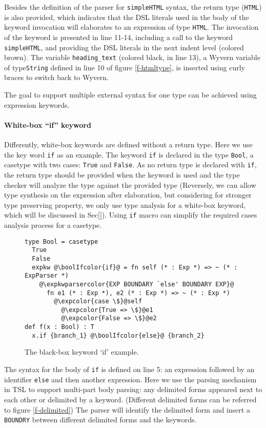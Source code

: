 \documentclass{sig-alternate}
\newcommand{\expkwparsercolor}[1]{\textcolor[HTML]{336699}{#1}}
\newcommand{\expcolor}[1]{\textcolor[HTML]{FF0033}{#1}}
\newcommand{\boolIfcolor}[1]{\textcolor[HTML]{5E0C0C}{#1}}
\newcommand{\mycaption}[1]{\vspace{-4px}\caption{#1}\vspace{-2px}}
\begin{document}
Besides the definition of the parser for \verb|simpleHTML| syntax, the return type (\verb|HTML|) is also provided, which indicates that the DSL literals used in the body of the keyword invocation will elaborates to an expression of type \verb|HTML|. The invocation of the keyword is presented in line 11-14, including a call to the keyword \verb|simpleHTML|, and providing the DSL literals in the next indent level (colored brown). The variable \verb|heading_text| (colored black, in line 13), a Wyvern variable of type\verb|String| defined in line 10 of figure \ref{f-htmltype}, is inserted using curly braces to switch back to Wyvern.

The goal to support multiple external syntax for one type can be achieved using expression keywords.

\paragraph{White-box ``if'' keyword}
Differently, white-box keywords are defined without a return type. Here we use the key word \verb|if| as an example. The keyword \verb|if| is declared in the type \verb|Bool|, a casetype with two cases: \verb|True| and \verb|False|. As no return type is declared with \verb|if|, the return type should be provided when the keyword is used and the type checker will analyze the type against the provided type (Reversely, we can allow type synthesis on the expression after elaboration, but considering for stronger type preserving property, we only use type analysis for a white-box keyword, which will be discussed in Sec[]). Using \verb|if| macro can simplify the required cases analysis process for a casetype.
\begin{figure}[t]
\begin{lstlisting}[style=wyvern]
type Bool = casetype 
  True
  False
  expkw @\boolIfcolor{if}@ = fn self (* : Exp *) => ~ (* : ExpParser *)
    @\expkwparsercolor{EXP BOUNDARY `else' BOUNDARY EXP}@
      fn e1 (* : Exp *), e2 (* : Exp *) => ~ (* : Exp *)
        @\expcolor{case \$}@self
          @\expcolor{True => \$}@e1
          @\expcolor{False => \$}@e2
def f(x : Bool) : T
  x.if {branch_1} @\boolIfcolor{else}@ {branch_2}
\end{lstlisting}
\mycaption{The black-box keyword `if' example.}
\label{if-example}
\end{figure}

The syntax for the body of \verb|if| is defined on line 5: an expression followed by an identifier \verb|else| and then another expression. Here we use the parsing mechanism in TSL to support multi-part body parsing: any delimited forms appeared next to each other or delimited by a keyword. (Different delimited forms can be referred to figure \ref{f-delimited}) The parser will identify the delimited form and insert a \verb|BOUNDRY| between different delimited forms and the keywords. 
\end{document}
